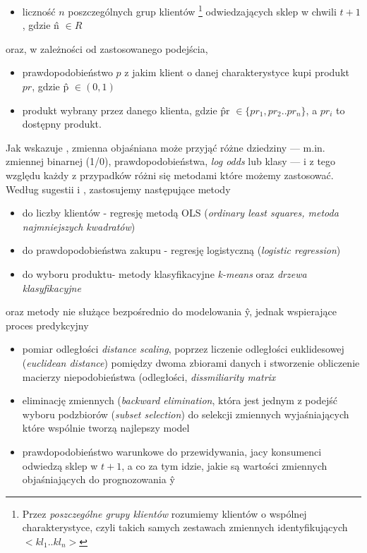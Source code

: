 \documentclass[polish, twoside, 12pt, a4paper]{article}
\theoremstyle{definition}
\theoremstyle{plain}
\theoremstyle{remark}
\begin{document}
	\begin{itemize} 
		\item liczność $n$ poszczególnych grup klientów \footnote{Przez \textit{poszczególne grupy klientów} rozumiemy klientów o wspólnej charakterystyce, czyli takich samych zestawach zmiennych identyfikujących $<kl_1..kl_n>$} odwiedzających sklep w chwili $t+1$, gdzie \^n $\in R$ 
	\end{itemize}
	oraz, w zależności od zastosowanego podejścia,
	\begin{itemize} 
		\item prawdopodobieństwo $p$ z jakim klient o danej charakterystyce kupi produkt $pr$, gdzie \^{p} $\in (0,1)$  
		\item produkt wybrany przez danego klienta, gdzie \^{pr} $\in \{pr_1,pr_2..pr_n\}$, a $pr_i$ to dostępny produkt.
	\end{itemize}

Jak wskazuje \cite{James2013}, zmienna objaśniana może przyjąć różne dziedziny --- m.in. zmiennej binarnej (1/0), prawdopodobieństwa, \textit{log odds} lub klasy --- i z tego względu każdy z przypadków różni się metodami które możemy zastosować. Według sugestii \cite{James2013} i \cite{hastie2001} , zastosujemy następujące metody

	\begin{itemize} 
		\item do liczby klientów - regresję metodą OLS (\textit{ordinary least squares, metoda najmniejszych kwadratów})
		\item do prawdopodobieństwa zakupu - regresję logistyczną (\textit{logistic regression})
		\item do wyboru produktu- metody klasyfikacyjne \textit{k-means} oraz \textit{drzewa klasyfikacyjne}
	\end{itemize}
	oraz metody nie służące bezpośrednio do modelowania \^{y}, jednak wspierające proces predykcyjny
	\begin{itemize} 
		\item pomiar odległości \textit{distance scaling}, poprzez liczenie odległości euklidesowej (\textit{euclidean distance}) pomiędzy dwoma zbiorami danych i stworzenie obliczenie macierzy niepodobieństwa (odległości, \textit{dissmiliarity matrix}
		\item eliminację zmiennych (\textit{backward elimination}, która jest jednym z podejść wyboru podzbiorów (\textit{subset selection}) do selekcji zmiennych wyjaśniających które wspólnie tworzą najlepszy model
		\item prawdopodobieństwo warunkowe do przewidywania, jacy konsumenci odwiedzą sklep w $t+1$, a co za tym idzie, jakie są wartości zmiennych objaśniających do prognozowania  \^{y}
	\end{itemize}	
\end{document}
